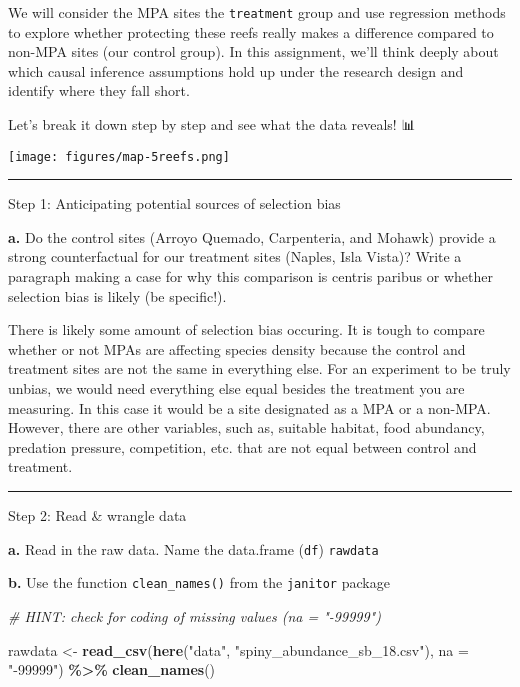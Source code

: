\documentclass[
]{article}
\newenvironment{Shaded}{\begin{snugshade}}{\end{snugshade}}
\newcommand{\AttributeTok}[1]{\textcolor[rgb]{0.13,0.29,0.53}{#1}}
\newcommand{\CommentTok}[1]{\textcolor[rgb]{0.56,0.35,0.01}{\textit{#1}}}
\newcommand{\FunctionTok}[1]{\textcolor[rgb]{0.13,0.29,0.53}{\textbf{#1}}}
\newcommand{\NormalTok}[1]{#1}
\newcommand{\OtherTok}[1]{\textcolor[rgb]{0.56,0.35,0.01}{#1}}
\newcommand{\SpecialCharTok}[1]{\textcolor[rgb]{0.81,0.36,0.00}{\textbf{#1}}}
\newcommand{\StringTok}[1]{\textcolor[rgb]{0.31,0.60,0.02}{#1}}
\begin{document}
We will consider the MPA sites the \texttt{treatment} group and use
regression methods to explore whether protecting these reefs really
makes a difference compared to non-MPA sites (our control group). In
this assignment, we'll think deeply about which causal inference
assumptions hold up under the research design and identify where they
fall short.

Let's break it down step by step and see what the data reveals! 📊

\texttt{[image: figures/map-5reefs.png]}

\begin{center}\rule{0.5\linewidth}{0.5pt}\end{center}

Step 1: Anticipating potential sources of selection bias

\textbf{a.} Do the control sites (Arroyo Quemado, Carpenteria, and
Mohawk) provide a strong counterfactual for our treatment sites (Naples,
Isla Vista)? Write a paragraph making a case for why this comparison is
centris paribus or whether selection bias is likely (be specific!).

There is likely some amount of selection bias occuring. It is tough to
compare whether or not MPAs are affecting species density because the
control and treatment sites are not the same in everything else. For an
experiment to be truly unbias, we would need everything else equal
besides the treatment you are measuring. In this case it would be a site
designated as a MPA or a non-MPA. However, there are other variables,
such as, suitable habitat, food abundancy, predation pressure,
competition, etc. that are not equal between control and treatment.

\begin{center}\rule{0.5\linewidth}{0.5pt}\end{center}

Step 2: Read \& wrangle data

\textbf{a.} Read in the raw data. Name the data.frame (\texttt{df})
\texttt{rawdata}

\textbf{b.} Use the function \texttt{clean\_names()} from the
\texttt{janitor} package

\begin{Shaded}
\begin{Highlighting}[]
\CommentTok{\# HINT: check for coding of missing values (\textasciigrave{}na = "{-}99999"\textasciigrave{})}

\NormalTok{rawdata }\OtherTok{\textless{}{-}} \FunctionTok{read\_csv}\NormalTok{(}\FunctionTok{here}\NormalTok{(}\StringTok{"data"}\NormalTok{, }\StringTok{"spiny\_abundance\_sb\_18.csv"}\NormalTok{), }\AttributeTok{na =} \StringTok{"{-}99999"}\NormalTok{) }\SpecialCharTok{\%\textgreater{}\%} 
    \FunctionTok{clean\_names}\NormalTok{()}
\end{Highlighting}
\end{Shaded}
\end{document}
